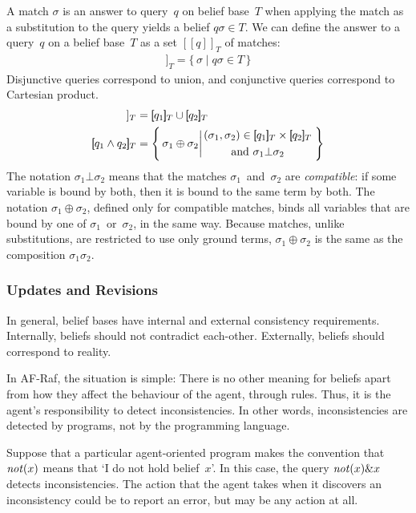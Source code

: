 \documentclass[a4paper,12pt,oneside,fleqn]{book} %
\newcommand{\eval}[1]{[\!\![#1]\!\!]}
\newcommand{\on}[2]{\genfrac{}{}{0pt}{0}{\strut#1}{\strut#2}}
\newcommand{\todo}[1]{[\textcolor{red}{TODO}: #1]}
\begin{document}
{A match $\sigma$ is an answer to query~$q$ on belief base~$T$
  when applying the match as a substitution to the query yields a belief
  $q\sigma \in T$.
We can define the answer to a query~$q$ on a belief base~$T$
  as a set $\eval{q}_T$ of matches:
\begin{align}
  \eval{q}_T
  =
  \{\,\sigma\mid q\sigma \in T\,\}
\end{align}
Disjunctive queries correspond to union,
  and conjunctive queries correspond to Cartesian product.
\begin{align}
  \eval{q_1 \lor q_2}_T
    &= \eval{q_1}_T \cup \eval{q_2}_T
\\
  \eval{q_1 \land q_2}_T
    &= \left\{\,\sigma_1\oplus\sigma_2
    \bigg\vert
    \on{
      (\sigma_1,\sigma_2)\in
      \eval{q_1}_T \times \eval{q_2}_T}%
      {\text{and $\sigma_1\bot\sigma_2$}}
\,\right\}
\end{align}
The notation $\sigma_1\bot\sigma_2$ means that the matches
$\sigma_1$~and~$\sigma_2$ are \emph{compatible}: if some variable is bound
by both, then it is bound to the same term by both. The notation
$\sigma_1\oplus\sigma_2$, defined only for compatible matches, binds all
variables that are bound by one of $\sigma_1$~or~$\sigma_2$, in the same
way. Because matches, unlike substitutions, are restricted to use only
ground terms, $\sigma_1\oplus\sigma_2$ is the same as the composition
$\sigma_1\sigma_2$.


\subsubsection{Updates and Revisions}

In general, belief bases have internal and external consistency
requirements.  Internally, beliefs should not contradict each-other.
Externally, beliefs should correspond to reality.

In AF-Raf, the situation is simple: There is no other meaning for beliefs
apart from how they affect the behaviour of the agent, through rules.
Thus, it is the agent's responsibility to detect inconsistencies.  In other
words, inconsistencies are detected by programs, not by the programming
language.

\begin{example} Suppose that a particular agent-oriented program makes the
convention that ${\it not}(x)$ means that `I do not hold belief~$x$'.  In
this case, the query ${\it not}(x)\&x$ detects inconsistencies.  The action
that the agent takes when it discovers an inconsistency could be to report
an error, but may be any action at all.  \end{example}

}
\end{document}
